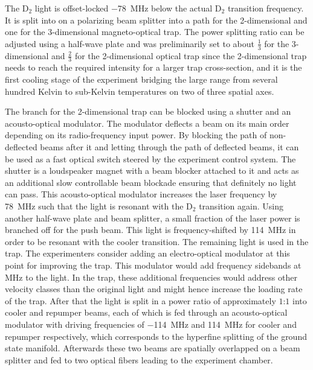 The D$_2$ light is offset-locked \SI{-78}{\mega\hertz} below the actual D$_2$ transition frequency. It is split into on a polarizing beam splitter into a path for the 2-dimensional and one for the 3-dimensional magneto-optical trap. The power splitting ratio can be adjusted using a half-wave plate and was preliminarily set to about $\frac{1}{3}$ for the 3-dimensional and $\frac{2}{3}$ for the 2-dimensional optical trap since the 2-dimensional trap needs to reach the required intensity for a larger trap cross-section, and it is the first cooling stage of the experiment bridging the large range from several hundred Kelvin to sub-Kelvin temperatures on two of three spatial axes.

The branch for the 2-dimensional trap can be blocked using a shutter and an acousto-optical modulator. The modulator deflects a beam on its main order depending on its radio-frequency input power. By blocking the path of non-deflected beams after it and letting through the path of deflected beams, it can be used as a fast optical switch steered by the experiment control system. The shutter is a loudspeaker magnet with a beam blocker attached to it and acts as an additional slow controllable beam blockade ensuring that definitely no light can pass. This acousto-optical modulator increases the laser frequency by \SI{+78}{\mega\hertz} such that the light is resonant with the D$_2$ transition again. Using another half-wave plate and beam splitter, a small fraction of the laser power is branched off for the push beam. This light is frequency-shifted by \SI{+114}{\mega\hertz} in order to be resonant with the cooler transition. The remaining light is used in the trap. The experimenters consider adding an electro-optical modulator at this point for improving the trap. This modulator would add frequency sidebands at \si{\mega\hertz} to the light. In the trap, these additional frequencies would address other velocity classes than the original light and might hence increase the loading rate of the trap.
After that the light is split in a power ratio of approximately $1$:$1$ into cooler and repumper beams, each of which is fed through an acousto-optical modulator with driving frequencies of \SI{-114}{\mega\hertz} and \SI{+114}{\mega\hertz} for cooler and repumper respectively, which corresponds to the hyperfine splitting of the ground state manifold. Afterwards these two beams are spatially overlapped on a beam splitter and fed to two optical fibers leading to the experiment chamber.

